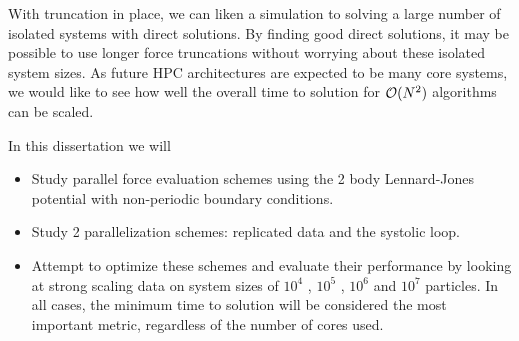 %
With truncation in place, we can liken a simulation to solving a
large number of isolated systems with direct solutions.
%
By finding good direct solutions, it may be possible to use longer force
truncations without worrying about these isolated system sizes.
%
As future HPC architectures are expected to be many core systems,
we would like to see how well the overall time to solution for
$\mathcal{O}{(N^2)}$ algorithms can be scaled.


%
In this dissertation we will
\begin{itemize}
\item
    Study parallel force evaluation schemes using
    the 2 body Lennard-Jones potential with
    non-periodic boundary conditions.

\item
    Study 2 parallelization schemes:
    replicated data and the systolic loop.

\item
    Attempt to optimize these schemes and
    evaluate their performance by looking at
    strong scaling data on system sizes of
    $10^4$ , $10^5$ , $10^6$ and $10^7$ particles.
    In all cases, the minimum time to solution will be
    considered the most important metric,
    regardless of the number of cores used.
\end  {itemize}
